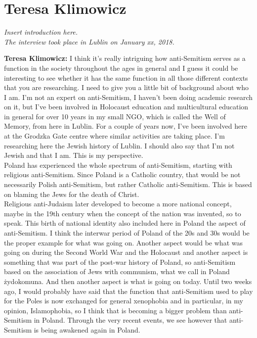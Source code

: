 \section{Teresa Klimowicz}

\textit{Insert introduction here.\\
The interview took place in Lublin on January xx, 2018.}\par
\vspace*{2em}
\textbf{Teresa Klimowicz:} I think it's really intriguing how anti-Semitism serves as a function in the society throughout the ages in general and I guess it could be interesting to see whether it has the same function in all those different contexts that you are researching. I need to give you a little bit of background about who I am. I'm not an expert on anti-Semitism, I haven't been doing academic research on it, but I've been involved in Holocaust education and multicultural education in general for over 10 years in my small NGO, which is called the Well of Memory, from here in Lublin. For a couple of years now, I've been involved here at the Grodzka Gate centre where similar activities are taking place. I'm researching here the Jewish history of Lublin. I should also say that I'm not Jewish and that I am. This is my perspective.\\
Poland has experienced the whole spectrum of anti-Semitism, starting with religious anti-Semitism. Since Poland is a Catholic country, that would be not necessarily Polish anti-Semitism, but rather Catholic anti-Semitism. This is based on blaming the Jews for the death of Christ.\\
Religious anti-Judaism later developed to become a more national concept, maybe in the 19th century when the concept of the nation was invented, so to speak. This birth of national identity also included here in Poland the aspect of anti-Semitism. I think the interwar period of Poland of the 20s and 30s would be the proper example for what was going on. Another aspect would be what was going on during the Second World War and the Holocaust and another aspect is something that was part of the post-war history of Poland, so anti-Semitism based on the association of Jews with communism, what we call in Poland żydokomuna. And then another aspect is what is going on today. Until two weeks ago, I would probably have said that the function that anti-Semitism used to play for the Poles is now exchanged for general xenophobia and in particular, in my opinion, Islamophobia, so I think that is becoming a bigger problem than anti-Semitism in Poland. Through the very recent events, we see however that anti-Semitism is being awakened again in Poland.  

